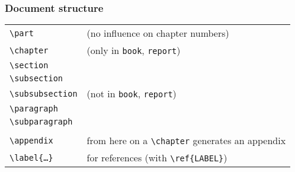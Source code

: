 \documentclass[aspectratio=169]{beamer}
\begin{document}
\begin{frame}[fragile]
  \frametitle{Document structure}

  \begin{center}
    \begin{tabular}{ll}
      \verb?\part? & (no influence on chapter numbers) \\
      \verb?\chapter? & (only in \texttt{book}, \texttt{report}) \\
      \verb?\section? & \\
      \verb?\subsection? & \\
      \verb?\subsubsection? & (not in \texttt{book}, \texttt{report}) \\
      \verb?\paragraph? & \\
      \verb?\subparagraph? & \\
      &\\
      \verb?\appendix? & from here on a \verb?\chapter? generates an  appendix  \\
      \verb?\label{?\texttt{\ldots}\verb?}? & for references (with \verb|\ref{LABEL}|)
    \end{tabular}
  \end{center}
\end{frame}
\end{document}
